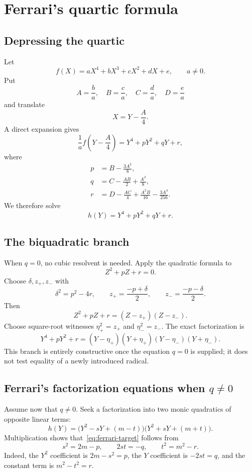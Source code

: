 \section{Ferrari's quartic formula}
\label{sec:quartic}

\subsection{Depressing the quartic}

Let
\[
 f(X)=aX^4+bX^3+cX^2+dX+e,
 \qquad a\ne0.
\]
Put
\[
 A=\frac ba,\quad B=\frac ca,\quad C=\frac da,\quad D=\frac ea
\]
and translate
\[
 X=Y-\frac A4.
\]
A direct expansion gives
\[
 \frac1a f\left(Y-\frac A4\right)=Y^4+pY^2+qY+r,
 \tag{F1}\label{eq:quartic-depress}
\]
where
\begin{align}
 p&=B-\frac{3A^2}{8},\label{eq:quartic-p}\\
 q&=C-\frac{AB}{2}+\frac{A^3}{8},\label{eq:quartic-q}\\
 r&=D-\frac{AC}{4}+\frac{A^2B}{16}-\frac{3A^4}{256}.
 \label{eq:quartic-r}
\end{align}
We therefore solve
\[
 h(Y)=Y^4+pY^2+qY+r.
\]

\subsection{The biquadratic branch}
\label{sec:quartic-biquadratic}

When $q=0$, no cubic resolvent is needed.  Apply the quadratic formula to
\[
 Z^2+pZ+r=0.
\]
Choose $\delta,z_+,z_-$ with
\[
 \delta^2=p^2-4r,
 \qquad
 z_+=\frac{-p+\delta}{2},
 \qquad
 z_-=\frac{-p-\delta}{2}.
\]
Then
\[
 Z^2+pZ+r=(Z-z_+)(Z-z_-).
\]
Choose square-root witnesses $\eta_+^2=z_+$ and $\eta_-^2=z_-$.  The exact
factorization is
\[
 Y^4+pY^2+r
 =(Y-\eta_+)(Y+\eta_+)(Y-\eta_-)(Y+\eta_-).
 \tag{F2}\label{eq:biquadratic-factor}
\]
This branch is entirely constructive once the equation $q=0$ is supplied; it
does not test equality of a newly introduced radical.

\subsection{Ferrari's factorization equations when \texorpdfstring{$q\ne0$}{q nonzero}}

Assume now that $q\ne0$.  Seek a factorization into two monic quadratics of
opposite linear terms:
\[
 h(Y)=\bigl(Y^2-sY+(m-t)\bigr)
       \bigl(Y^2+sY+(m+t)\bigr).
 \tag{F3}\label{eq:ferrari-target}
\]
Multiplication shows that~\eqref{eq:ferrari-target} follows from
\[
 s^2=2m-p,
 \qquad
 2st=-q,
 \qquad
 t^2=m^2-r.
 \tag{F4}\label{eq:ferrari-parameters}
\]
Indeed, the $Y^2$ coefficient is $2m-s^2=p$, the $Y$ coefficient is
$-2st=q$, and the constant term is $m^2-t^2=r$.

